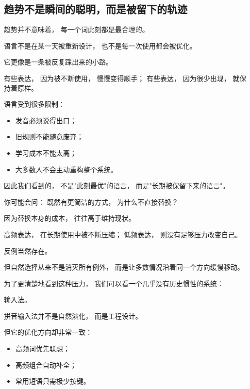 \documentclass[openany, a4paper, 12pt]{book}
\begin{document}
\subsection{趋势不是瞬间的聪明，而是被留下的轨迹}

趋势并不意味着，
每一个词此刻都是最合理的。

语言不是在某一天被重新设计，
也不是每一次使用都会被优化。

它更像是一条被反复踩出来的小路。

有些表达，
因为被不断使用，
慢慢变得顺手；
有些表达，
因为很少出现，
就保持着原样。

语言受到很多限制：

\begin{itemize}
	\item 发音必须说得出口；
	\item 旧规则不能随意废弃；
	\item 学习成本不能太高；
	\item 大多数人不会主动重构整个系统。
\end{itemize}

因此我们看到的，
不是"此刻最优"的语言，
而是"长期被保留下来的语言"。

\begin{tcolorbox}[colback=yellow!5,title=\textit{读者行为预测}]
	你可能会问：
	既然有更简洁的方式，
	为什么不直接替换？
\end{tcolorbox}

因为替换本身的成本，
往往高于维持现状。

高频表达，
在长期使用中被不断压缩；
低频表达，
则没有足够压力改变自己。

反例当然存在。

但自然选择从来不是消灭所有例外，
而是让多数情况沿着同一个方向缓慢移动。

\vspace{0.5em}

为了更清楚地看到这种压力，
我们可以看一个几乎没有历史惯性的系统：

输入法。

拼音输入法并不是自然演化，
而是工程设计。

但它的优化方向却非常一致：

\begin{itemize}
	\item 高频词优先联想；
	\item 高频组合自动补全；
	\item 常用短语只需极少按键。
\end{itemize}
\end{document}
